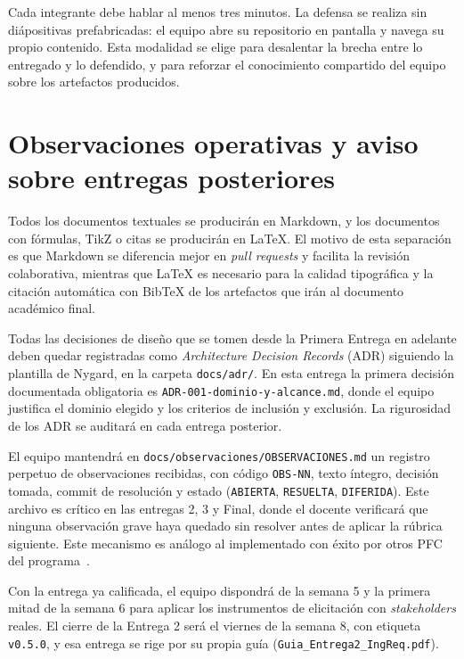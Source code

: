 \documentclass[11pt,a4paper]{article}
\begin{document}
Cada integrante debe hablar al menos tres minutos. La defensa se realiza sin di\'apositivas prefabricadas: el equipo abre su repositorio en pantalla y navega su propio contenido. Esta modalidad se elige para desalentar la brecha entre lo entregado y lo defendido, y para reforzar el conocimiento compartido del equipo sobre los artefactos producidos.

\section{Observaciones operativas y aviso sobre entregas posteriores}

Todos los documentos textuales se producir\'an en Markdown, y los documentos con f\'ormulas, TikZ o citas se producir\'an en LaTeX. El motivo de esta separaci\'on es que Markdown se diferencia mejor en \emph{pull requests} y facilita la revisi\'on colaborativa, mientras que LaTeX es necesario para la calidad tipogr\'afica y la citaci\'on autom\'atica con BibTeX de los artefactos que ir\'an al documento acad\'emico final.

Todas las decisiones de dise\~no que se tomen desde la Primera Entrega en adelante deben quedar registradas como \emph{Architecture Decision Records} (ADR) siguiendo la plantilla de Nygard, en la carpeta \texttt{docs/adr/}. En esta entrega la primera decisi\'on documentada obligatoria es \texttt{ADR-001-dominio-y-alcance.md}, donde el equipo justifica el dominio elegido y los criterios de inclusi\'on y exclusi\'on. La rigurosidad de los ADR se auditar\'a en cada entrega posterior.

El equipo mantendr\'a en \texttt{docs/observaciones/OBSERVACIONES.md} un registro perpetuo de observaciones recibidas, con c\'odigo \texttt{OBS-NN}, texto \'integro, decisi\'on tomada, commit de resoluci\'on y estado (\texttt{ABIERTA}, \texttt{RESUELTA}, \texttt{DIFERIDA}). Este archivo es cr\'itico en las entregas 2, 3 y Final, donde el docente verificar\'a que ninguna observaci\'on grave haya quedado sin resolver antes de aplicar la r\'ubrica siguiente. Este mecanismo es an\'alogo al implementado con \'exito por otros PFC del programa~\cite{dick2017requirements,wiegers2013software}.

Con la entrega ya calificada, el equipo dispondr\'a de la semana 5 y la primera mitad de la semana 6 para aplicar los instrumentos de elicitaci\'on con \emph{stakeholders} reales. El cierre de la Entrega 2 ser\'a el viernes de la semana 8, con etiqueta \texttt{v0.5.0}, y esa entrega se rige por su propia gu\'ia (\texttt{Guia\_Entrega2\_IngReq.pdf}).



\end{document}
